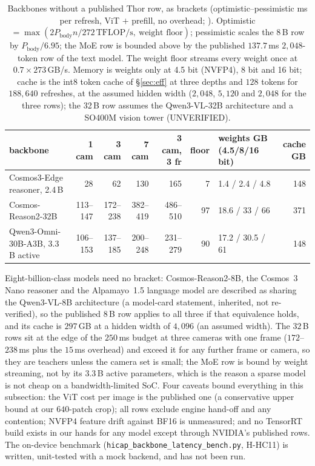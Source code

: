 \begin{table}[h]
\centering\footnotesize
\caption{Backbones without a published Thor row, as brackets (optimistic--pessimistic ms per refresh, ViT $+$ prefill, no overhead; \evE). Optimistic $=\max(2P_{\text{body}}n/272\,\text{TFLOP/s},\ \text{weight floor})$; pessimistic scales the 8\,B row by $P_{\text{body}}/6.95$; the MoE row is bounded above by the published $137.7$\,ms $2{,}048$-token row of the text model. The weight floor streams every weight once at $0.7\times273$\,GB/s. Memory is weights only at 4.5 bit (NVFP4), 8 bit and 16 bit; cache is the int8 token cache of \S\ref{sec:eff} at three depths and $128$ tokens for $188{,}640$ refreshes, at the assumed hidden width ($2{,}048$, $5{,}120$ and $2{,}048$ for the three rows); the 32\,B row assumes the Qwen3-VL-32B architecture and a SO400M vision tower (UNVERIFIED).}
\label{tab:bracket}
\begin{tabular}{@{}p{3.3cm}rrrrrp{2.3cm}r@{}}
\toprule
backbone & 1 cam & 3 cam & 7 cam & 3 cam, 3 fr & floor & weights GB (4.5/8/16 bit) & cache GB \\ \midrule
Cosmos3-Edge reasoner, 2.4\,B & 28 & 62 & 130 & 165 & 7 & 1.4 / 2.4 / 4.8 & 148 \\
Cosmos-Reason2-32B & 113--147 & 172--238 & 382--419 & 486--510 & 97 & 18.6 / 33 / 66 & 371 \\
Qwen3-Omni-30B-A3B, 3.3\,B active & 106--153 & 137--185 & 200--248 & 231--279 & 90 & 17.2 / 30.5 / 61 & 148 \\
\bottomrule
\end{tabular}
\end{table}
Eight-billion-class models need no bracket: Cosmos-Reason2-8B, the Cosmos~3 Nano reasoner and the Alpamayo~1.5 language model are described as sharing the Qwen3-VL-8B architecture (a model-card statement, inherited, not re-verified), so the published 8\,B row applies to all three if that equivalence holds, and its cache is $297$\,GB at a hidden width of $4{,}096$ (an assumed width). The $32$\,B rows sit at the edge of the $250$\,ms budget at three cameras with one frame ($172$--$238$\,ms plus the $15$\,ms overhead) and exceed it for any further frame or camera, so they are teachers unless the camera set is small; the MoE row is bound by weight streaming, not by its $3.3$\,B active parameters, which is the reason a sparse model is not cheap on a bandwidth-limited SoC. Four caveats bound everything in this subsection: the ViT cost per image is the published one (a conservative upper bound at our $640$-patch crop); all rows exclude engine hand-off and any contention; NVFP4 feature drift against BF16 is unmeasured; and no TensorRT build exists in our hands for any model except through NVIDIA's published rows. The on-device benchmark (\texttt{hicap\_backbone\_latency\_bench.py}, H-HC11) is written, unit-tested with a mock backend, and has not been run.

